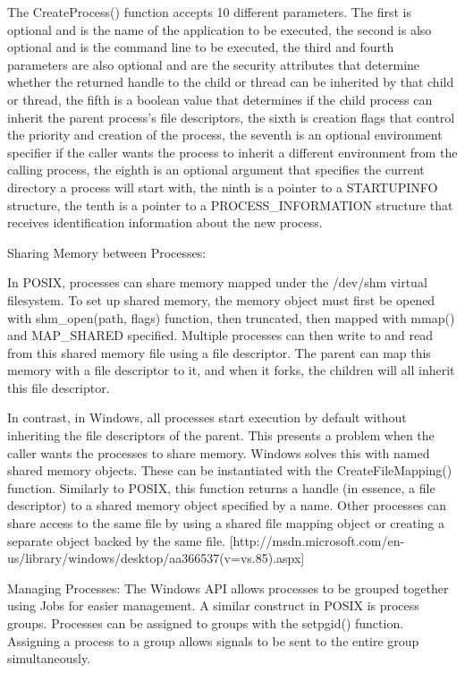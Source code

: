 \documentclass[letterpaper,10pt,titlepage]{article}
\begin{document}
\begin{enumerate}
The CreateProcess() function accepts 10 different parameters. The first is optional and is the name of the application to be executed, the second is also optional and is the command line to be executed, the third and fourth parameters are also optional and are the security attributes that determine whether the returned handle to the child or thread can be inherited by that child or thread, the fifth is a boolean value that determines if the child process can inherit the parent process's file descriptors, the sixth is creation flags that control the priority and creation of the process, the seventh is an optional environment specifier if the caller wants the process to inherit a different environment from the calling process, the eighth is an optional argument that specifies the current directory a process will start with, the ninth is a pointer to a STARTUPINFO structure, the tenth is a pointer to a PROCESS_INFORMATION structure that receives identification information about the new process.

Sharing Memory between Processes:

In POSIX, processes can share memory mapped under the /dev/shm virtual filesystem. To set up shared memory, the memory object must first be opened with shm_open(path, flags) function, then truncated, then mapped with mmap() and MAP_SHARED specified. Multiple processes can then write to and read from this shared memory file using a file descriptor. The parent can map this memory with a file descriptor to it, and when it forks, the children will all inherit this file descriptor.

In contrast, in Windows, all processes start execution by default without inheriting the file descriptors of the parent. This presents a problem when the caller wants the processes to share memory. Windows solves this with named shared memory objects. These can be instantiated with the CreateFileMapping() function. Similarly to POSIX, this function returns a handle (in essence, a file descriptor) to a shared memory object specified by a name. Other processes can share access to the same file by using a shared file mapping object or creating a separate object backed by the same file. [http://msdn.microsoft.com/en-us/library/windows/desktop/aa366537(v=vs.85).aspx]

Managing Processes:
The Windows API allows processes to be grouped together using Jobs for easier management. A similar construct in POSIX is process groups. Processes can be assigned to groups with the setpgid() function. Assigning a process to a group allows signals to be sent to the entire group simultaneously.


\end{enumerate}

%
\end{document}

